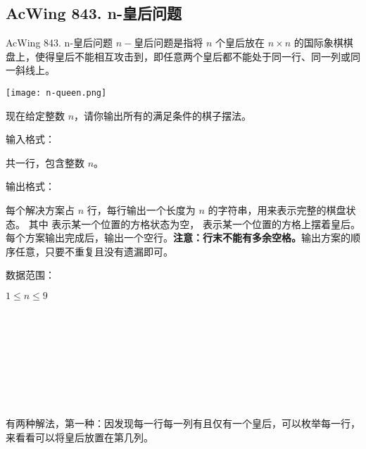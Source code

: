 \subsection{AcWing 843. n-皇后问题}
\begin{titledbox}{AcWing 843. n-皇后问题}
    $n-$皇后问题是指将 $n$ 个皇后放在 $n \times n$ 的国际象棋棋盘上，使得皇后不能相互攻击到，即任意两个皇后都不能处于同一行、同一列或同一斜线上。

    \texttt{[image: n-queen.png]}

    现在给定整数 $n$，请你输出所有的满足条件的棋子摆法。

    输入格式：

    共一行，包含整数 $n$。

    输出格式：

    每个解决方案占 $n$ 行，每行输出一个长度为 $n$ 的字符串，用来表示完整的棋盘状态。
    其中  表示某一个位置的方格状态为空， 表示某一个位置的方格上摆着皇后。每个方案输出完成后，输出一个空行。\textbf{注意：行末不能有多余空格。}输出方案的顺序任意，只要不重复且没有遗漏即可。

    数据范围：

    $1 \le n \le 9$

    \begin{inputblock}
    \end{inputblock}
    \begin{outputblock}
         \\
         \\
         \\
         \\

         \\
         \\
         \\
    \end{outputblock}
\end{titledbox}

有两种解法，第一种：因发现每一行每一列有且仅有一个皇后，可以枚举每一行，来看看可以将皇后放置在第几列。

